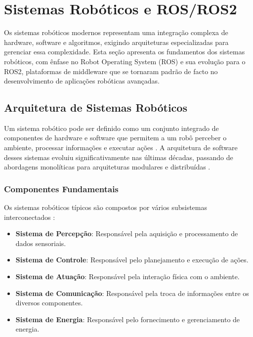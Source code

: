 \section{Sistemas Robóticos e ROS/ROS2}

Os sistemas robóticos modernos representam uma integração complexa de hardware, software e algoritmos, exigindo arquiteturas especializadas para gerenciar essa complexidade. Esta seção apresenta os fundamentos dos sistemas robóticos, com ênfase no Robot Operating System (ROS) e sua evolução para o ROS2, plataformas de middleware que se tornaram padrão de facto no desenvolvimento de aplicações robóticas avançadas.

\subsection{Arquitetura de Sistemas Robóticos}

Um sistema robótico pode ser definido como um conjunto integrado de componentes de hardware e software que permitem a um robô perceber o ambiente, processar informações e executar ações \cite{Siegwart2011}. A arquitetura de software desses sistemas evoluiu significativamente nas últimas décadas, passando de abordagens monolíticas para arquiteturas modulares e distribuídas \cite{Kortenkamp2016}.

\subsubsection{Componentes Fundamentais}

Os sistemas robóticos típicos são compostos por vários subsistemas interconectados \cite{Siegwart2011, Kortenkamp2016}:

\begin{itemize}
    \item \textbf{Sistema de Percepção}: Responsável pela aquisição e processamento de dados sensoriais.
    \item \textbf{Sistema de Controle}: Responsável pelo planejamento e execução de ações.
    \item \textbf{Sistema de Atuação}: Responsável pela interação física com o ambiente.
    \item \textbf{Sistema de Comunicação}: Responsável pela troca de informações entre os diversos componentes.
    \item \textbf{Sistema de Energia}: Responsável pelo fornecimento e gerenciamento de energia.
\end{itemize}

